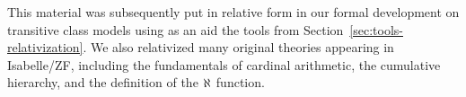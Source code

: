 This material was subsequently put in relative form in our formal
development on transitive class models \cite{Transitive_Models-AFP}
using as an aid the tools from
Section~\ref{sec:tools-relativization}. We also relativized many
original theories appearing in Isabelle/ZF, including the
fundamentals of cardinal arithmetic, the cumulative hierarchy, and the
definition of the $\aleph_{}$ function.


